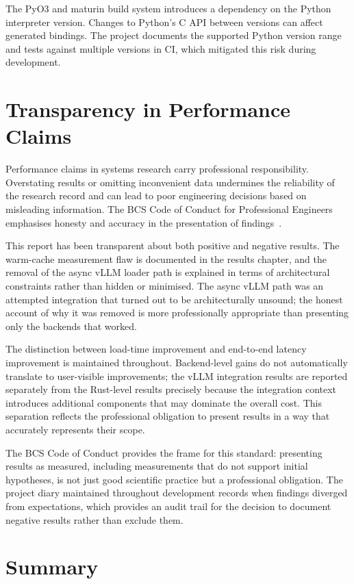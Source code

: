 The PyO3 and maturin build system introduces a dependency on the Python interpreter version. Changes to Python's C API between versions can affect generated bindings. The project documents the supported Python version range and tests against multiple versions in CI, which mitigated this risk during development.

\section{Transparency in Performance Claims}

Performance claims in systems research carry professional responsibility. Overstating results or omitting inconvenient data undermines the reliability of the research record and can lead to poor engineering decisions based on misleading information. The BCS Code of Conduct for Professional Engineers emphasises honesty and accuracy in the presentation of findings~\cite{bcs_code}.

This report has been transparent about both positive and negative results. The warm-cache measurement flaw is documented in the results chapter, and the removal of the async vLLM loader path is explained in terms of architectural constraints rather than hidden or minimised. The async vLLM path was an attempted integration that turned out to be architecturally unsound; the honest account of why it was removed is more professionally appropriate than presenting only the backends that worked.

The distinction between load-time improvement and end-to-end latency improvement is maintained throughout. Backend-level gains do not automatically translate to user-visible improvements; the vLLM integration results are reported separately from the Rust-level results precisely because the integration context introduces additional components that may dominate the overall cost. This separation reflects the professional obligation to present results in a way that accurately represents their scope.

The BCS Code of Conduct provides the frame for this standard: presenting results as measured, including measurements that do not support initial hypotheses, is not just good scientific practice but a professional obligation. The project diary maintained throughout development records when findings diverged from expectations, which provides an audit trail for the decision to document negative results rather than exclude them.

\section{Summary}


